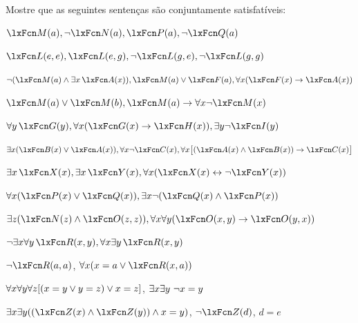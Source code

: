 \problempart
Mostre que as seguintes sentenças são conjuntamente satisfatíveis:
\begin{compactlist}
\item  $\atom{M}{a}, \enot \atom{N}{a}, \atom{P}{a}, \enot \atom{Q}{a}$
\item $\atom{L}{e,e}, \atom{L}{e,g}, \enot \atom{L}{g,e}, \enot \atom{L}{g,g}$
\item $\enot (\atom{M}{a} \eand \exists x\, \atom{A}{x}), \atom{M}{a} \eor \atom{F}{a}, \forall x(\atom{F}{x} \eif \atom{A}{x})$
\item $\atom{M}{a} \eor \atom{M}{b}, \atom{M}{a} \eif \forall x \enot \atom{M}{x}$
\item $\forall y\, \atom{G}{y}, \forall x (\atom{G}{x} \eif \atom{H}{x}), \exists y \enot \atom{I}{y}$
\item $\exists x(\atom{B}{x} \eor \atom{A}{x}), \forall x \enot \atom{C}{x}, \forall x\bigl[(\atom{A}{x} \eand \atom{B}{x}) \eif \atom{C}{x}\bigr]$
\item $\exists x\, \atom{X}{x}, \exists x\, \atom{Y}{x}, \forall x(\atom{X}{x} \eiff \enot \atom{Y}{x})$
\item $\forall x(\atom{P}{x} \eor \atom{Q}{x}), \exists x\enot(\atom{Q}{x} \eand \atom{P}{x})$
\item $\exists z(\atom{N}{z} \eand \atom{O}{z,z}), \forall x\forall y(\atom{O}{x,y} \eif \atom{O}{y,x})$
\item $\enot \exists x \forall y\, \atom{R}{x,y}, \forall x \exists y\, \atom{R}{x,y}$
\item $\enot \atom{R}{a,a}$, $\forall x (x=a \eor \atom{R}{x,a})$
\item $\forall x\forall y\forall z[(x=y \vee y=z )\vee x=z]$, $\exists x\exists y\ \neg x= y$
\item $\exists x\exists y((\atom{Z}{x} \eand \atom{Z}{y} )\eand x=y)$, $\enot \atom{Z}{d}$, $d=e$
\end{compactlist}


